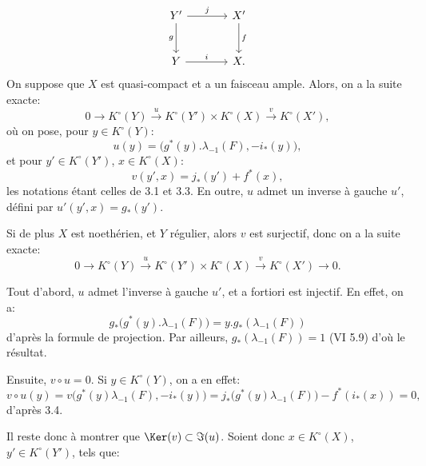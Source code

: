 \[
\begin{tikzcd}[column sep=large,row sep=large]
Y' \arrow[r,"j"] \arrow[d,"g"'] & X' \arrow[d,"f"]\\
Y \arrow[r,"i"] & X.
\end{tikzcd}
\]
On
suppose que \(X\) est quasi-compact et a un faisceau ample. Alors, on a la suite exacte:
\[
0\longrightarrow K^\circ(Y)\xrightarrow{u}K^\circ(Y')\times K^\circ(X)
\xrightarrow{v}K^\circ(X'),
\]
où on pose, pour \(y\in K^\circ(Y)\):
\[
u(y)=\bigl(g^*(y).\lambda_{-1}(F),-i_*(y)\bigr),
\]
et pour \(y'\in K^\circ(Y')\), \(x\in K^\circ(X)\):
\[
v(y',x)=j_*(y')+f^*(x),
\]
les notations étant celles de 3.1 et 3.3. En outre, \(u\) admet un inverse à gauche \(u'\), défini par \(u'(y',x)=g_*(y')\).

Si de plus \(X\) est noethérien, et \(Y\) régulier, alors \(v\) est surjectif, donc on a la suite exacte:
\[
0\longrightarrow K^\circ(Y)\xrightarrow{u}K^\circ(Y')\times K^\circ(X)
\xrightarrow{v}K^\circ(X')\longrightarrow0.
\]

Tout d'abord, \(u\) admet l'inverse à gauche \(u'\), et a fortiori est injectif. En effet, on a:
\[
g_*\bigl(g^*(y).\lambda_{-1}(F)\bigr)
=y.g_*(\lambda_{-1}(F))
\]
d'après la formule de projection. Par ailleurs, \(g_*(\lambda_{-1}(F))=1\) (VI 5.9) d'où le résultat.

Ensuite, \(v\circ u=0\). Si \(y\in K^\circ(Y)\), on a en effet:
\[
v\circ u(y)
=v\bigl(g^*(y)\lambda_{-1}(F),-i_*(y)\bigr)
=j_*\bigl(g^*(y)\lambda_{-1}(F)\bigr)-f^*(i_*(x))=0,
\]
d'après 3.4.

Il reste donc à montrer que \(\Ker(v)\subset \Im(u)\). Soient donc \(x\in K^\circ(X)\), \(y'\in K^\circ(Y')\), tels que:
